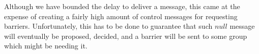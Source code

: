 \documentclass[times, 10pt]{article}
\begin{document}
Although we have bounded the delay to deliver a message, this came at the expense of creating a fairly high amount of control messages for requesting barriers. Unfortunately, this has to be done to guarantee that such $null$ message will eventually be proposed, decided, and a barrier will be sent to some group which might be needing it.
% 
% 
% 
% 
% 
% 
\end{document}
